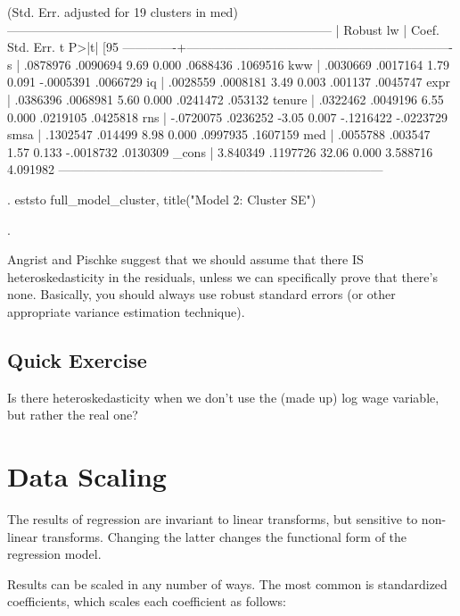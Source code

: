 \documentclass[12pt]{article}
\begin{document}
\begin{stlog}
                                   (Std. Err. adjusted for 19 clusters in med)
------------------------------------------------------------------------------
             |               Robust
          lw |      Coef.   Std. Err.      t    P>|t|     [95%
-------------+----------------------------------------------------------------
           s |   .0878976   .0090694     9.69   0.000     .0688436    .1069516
         kww |   .0030669   .0017164     1.79   0.091    -.0005391    .0066729
          iq |   .0028559   .0008181     3.49   0.003      .001137    .0045747
        expr |   .0386396   .0068981     5.60   0.000     .0241472     .053132
      tenure |   .0322462   .0049196     6.55   0.000     .0219105    .0425818
         rns |  -.0720075   .0236252    -3.05   0.007    -.1216422   -.0223729
        smsa |   .1302547    .014499     8.98   0.000     .0997935    .1607159
         med |   .0055788    .003547     1.57   0.133    -.0018732    .0130309
       _cons |   3.840349   .1197726    32.06   0.000     3.588716    4.091982
------------------------------------------------------------------------------

. eststo full_model_cluster, title("Model 2: Cluster SE")

. 
\end{stlog}

Angrist and Pischke suggest that we should assume that there IS
heteroskedasticity in the residuals, unless we can specifically prove
that there's none. Basically, you should always use robust standard
errors (or other appropriate variance estimation technique). 

\subsection{Quick Exercise}

Is there heteroskedasticity when we don't use the (made up) log wage
variable, but rather the real one?

\section{Data Scaling}
\label{sec:data-scaling}

The results of regression are invariant to linear transforms, but
sensitive to non-linear transforms. Changing the latter changes the
functional form of the regression model.

Results can be scaled in any number of ways. The most common is
standardized coefficients, which scales each coefficient as follows:
\end{document}
